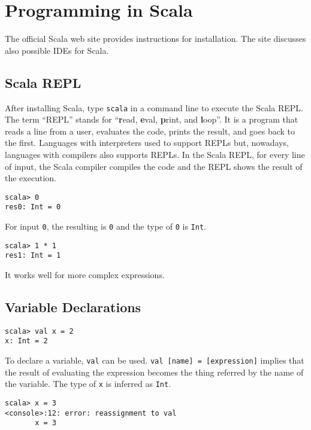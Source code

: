 \section{Programming in Scala}

The official Scala web site provides
instructions for installation. The site discusses also possible IDEs for
Scala.

\subsection{Scala REPL}

After installing Scala, type \verb+scala+ in a command line to execute the Scala
REPL. The term ``REPL'' stands for ``\textbf{r}ead, \textbf{e}val, \textbf{p}rint, and
\textbf{l}oop''.
It is a program that reads a line from a user, evaluates the code, prints
the result, and goes back to the first. Languages with interpreters used to
support REPLs but, nowadays, languages with compilers also supports REPLs. In
the Scala REPL, for every line of input, the Scala compiler compiles the code
and the REPL shows the result of the execution.

\begin{verbatim}
scala> 0
res0: Int = 0
\end{verbatim}

For input  \verb+0+, the resulting  is \verb+0+ and the type of \verb+0+
is \verb+Int+.

\begin{verbatim}
scala> 1 * 1
res1: Int = 1
\end{verbatim}

It works well for more complex expressions.

\subsection{Variable Declarations}

\begin{verbatim}
scala> val x = 2
x: Int = 2
\end{verbatim}

To declare a variable, \verb+val+ can be used. \verb+val [name] = [expression]+ implies
that the result of evaluating the expression becomes the thing referred by the
name of the variable. The type of \verb+x+ is inferred as \verb+Int+.

\begin{verbatim}
scala> x = 3
<console>:12: error: reassignment to val
       x = 3
\end{verbatim}

